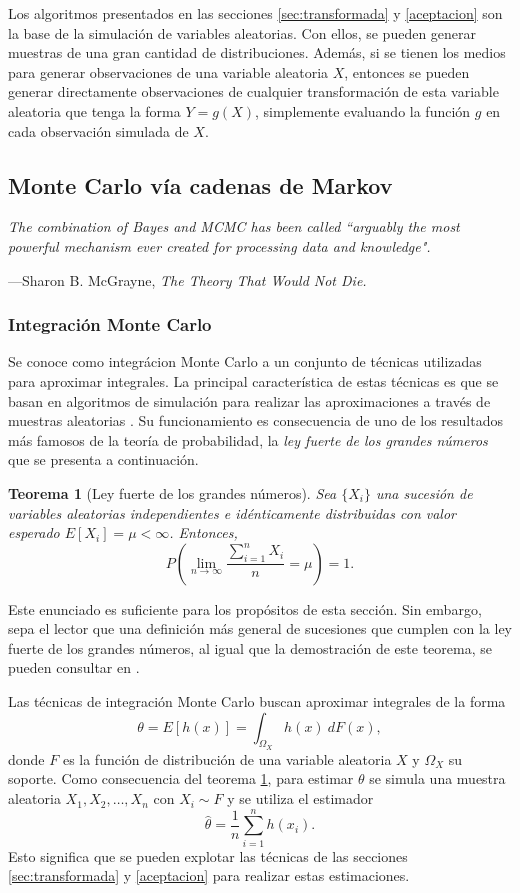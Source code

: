 \documentclass[11pt,a4paper]{article}
\newtheorem{theorem}{Teorema}[section]
\begin{document}
Los algoritmos presentados en las secciones \ref{sec:transformada} y \ref{aceptacion} son la base de la simulación de variables aleatorias. Con ellos, se pueden generar muestras de una gran cantidad de distribuciones. Además, si se tienen los medios para generar observaciones de una variable aleatoria $X$, entonces se pueden generar directamente observaciones de cualquier transformación de esta variable aleatoria que tenga la forma $Y = g(X)$, simplemente evaluando la función $g$ en cada observación simulada de $X$.

\subsection{Monte Carlo vía cadenas de Markov}	
\label{sec_cadenas}
\epigraph{\itshape The combination of Bayes and MCMC has been called ``arguably the most powerful mechanism ever created for processing data and knowledge".}{---Sharon B. McGrayne, \textit{The Theory That Would Not Die.}}
\subsubsection*{Integración Monte Carlo}

Se conoce como integrácion Monte Carlo a un conjunto de técnicas utilizadas para aproximar integrales. La principal característica de estas técnicas es que se basan en algoritmos de simulación para realizar las aproximaciones a través de muestras aleatorias \citep{casella}. Su funcionamiento es consecuencia de uno de los resultados más famosos de la teoría de probabilidad, la \textit{ley fuerte de los grandes números} que se presenta a continuación.

\begin{theorem}[Ley fuerte de los grandes números]
\label{grandes_numeros}
Sea $\lbrace X_i \rbrace$ una sucesión de variables aleatorias independientes e idénticamente distribuidas con valor esperado $E[X_i]=\mu < \infty$. Entonces,
$$P\left( \lim_{n \to \infty} \frac{\sum_{i=1}^{n} X_i}{n} = \mu \right) = 1.$$
\end{theorem}

Este enunciado es suficiente para los propósitos de esta sección. Sin embargo, sepa el lector que una definición más general de sucesiones que cumplen con la ley fuerte de los grandes números, al igual que la demostración de este teorema, se pueden consultar en \citet{feller}.

Las técnicas de integración Monte Carlo buscan aproximar integrales de la forma
$$\theta = E[h(x)] = \int_{\Omega_X} h(x) \ dF(x),$$ donde $F$ es la función de distribución de una variable aleatoria $X$ y $\Omega_X$ su soporte. Como consecuencia del teorema \ref{grandes_numeros}, para estimar $\theta$ se simula una muestra aleatoria $X_1, X_2, \dots, X_n$ con $X_i\sim F$ y se utiliza el estimador $$\hat{\theta} = \frac{1}{n}\sum_{i=1}^n h(x_i).$$ Esto significa que se pueden explotar las técnicas de las secciones \ref{sec:transformada} y \ref{aceptacion} para realizar estas estimaciones.
\end{document}
